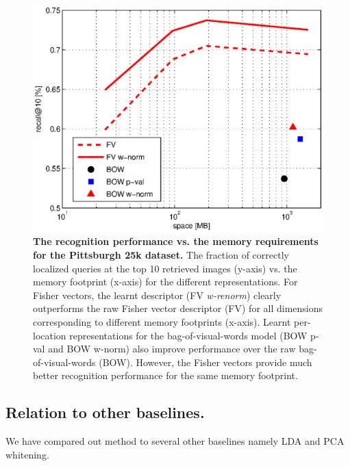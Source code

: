     \begin{figure}[t!]
        \centering
        \includegraphics[width=1.1\linewidth]{imgs/FVmemory02}    
        \caption{
            \textbf{The recognition performance vs. the memory requirements for the Pittsburgh 25k dataset.} 
            The fraction of correctly localized queries at the top 10 retrieved images (y-axis) vs. the memory footprint (x-axis) for the different representations. For Fisher vectors, the learnt descriptor (FV \emph{w-renorm}) clearly outperforms the raw Fisher vector descriptor (FV) for all dimensions corresponding to different memory footprints (x-axis). 
            Learnt per-location representations for the bag-of-visual-words model (BOW p-val and BOW w-norm) also improve performance over the raw bag-of-visual-words (BOW). However, the Fisher vectors provide much better recognition performance for the same memory footprint.  
        }
        \label{fig:memory}
    \end{figure}

\textcolor{petr}{
  \subsection{Relation to other baselines.}
  We have compared out method to several other baselines namely LDA and PCA whitening.
}
